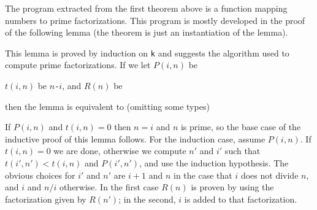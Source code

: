 The program extracted from the first theorem above is a function mapping
numbers to prime factorizations.  This program is mostly developed in the
proof of
the following lemma (the theorem is just an instantiation of the lemma).
\begin{Numath}
%
\end{Numath}%
This lemma is proved by induction on {\tt k} and suggests the algorithm used
to compute prime factorizations.  If we let $P(i,n)$ be 
\begin{Numath}
%
\end{Numath}%
$t(i,n)$ be {\tt $n$-$i$}, and $R(n)$ be 
\begin{Numath}
%
\end{Numath}%
then the lemma is equivalent to (omitting some types)
\begin{Numath}
% 
\end{Numath}%
If $P(i,n)$ and $t(i,n)=0$ then $n=i$ and $n$ is prime, so the base case of
the inductive proof of this lemma follows.
For the induction case,
assume $P(i,n)$.  If $t(i,n)=0$ we are done, otherwise we compute $n'$ and $i'$
such
that $t(i',n')<t(i,n)$ and $P(i',n')$, and use the induction hypothesis.  The
obvious choices for $i'$ and $n'$ are $i+1$ and $n$ in the case that $i$
does not divide $n$, and $i$ and $n/i$ otherwise.  In the first case $R(n)$
is proven by using the factorization given by $R(n')$; in the second, $i$ is
added to that factorization.  

